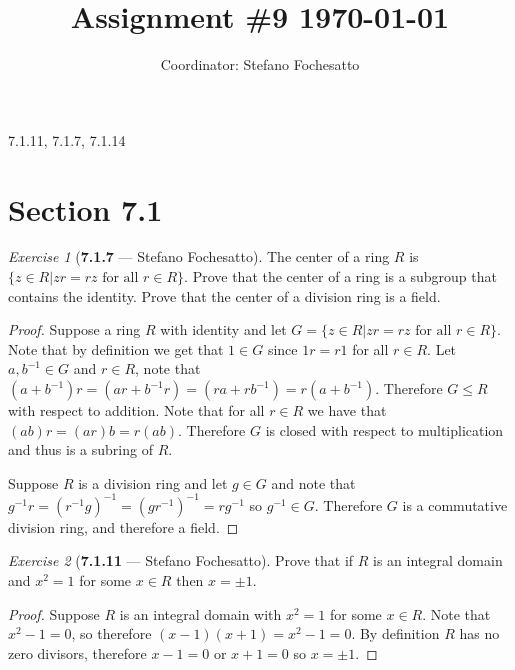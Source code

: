 \documentclass[12pt]{amsart}
\title{Assignment \#9 \today}
\author{Coordinator: Stefano Fochesatto}
\theoremstyle{remark}
\newtheorem*{exercise}{Exercise}%
\theoremstyle{mycomment}
\begin{document}
\maketitle
\doublespacing %

7.1.11, 7.1.7, 7.1.14

\section*{Section 7.1}


\begin{exercise}[\textbf{7.1.7} --- Stefano Fochesatto] The center of a ring $R$ is $\{z \in R| zr = rz \text{ for all } r \in R\}$. Prove that 
  the center of a ring is a subgroup that contains the identity. Prove that the center of a division ring is a field. 
  \begin{proof} Suppose a ring $R$ with identity and let $G = \{z \in R| zr = rz \text{ for all } r \in R\}$. Note that by definition we get that 
    $1 \in G$ since $1r = r1$ for all $r \in R$. Let $a, b^{-1} \in G$ and $r \in R$, note that
    $(a + b^{-1})r = (ar + b^{-1}r) = (ra + rb^{-1}) = r(a + b^{-1})$. Therefore $G \leq R$ with respect to 
    addition. Note that for all $r \in R$ we have that $(ab)r = (ar)b = r(ab)$. Therefore $G$ is closed with respect to multiplication 
    and thus is a subring of $R$. 

    Suppose $R$ is a division ring and let $g \in G$ and note that $g^{-1}r = (r^{-1}g)^{-1} = (gr^{-1})^{-1} = rg^{-1}$
    so $g^{-1} \in G$. Therefore $G$ is a commutative division ring, and therefore a field. 
  \end{proof}
\end{exercise}
\vspace{.15in}



\begin{exercise}[\textbf{7.1.11} --- Stefano Fochesatto] Prove that if $R$ is an integral domain and $x^2 = 1$ for some $x \in R$ then $x = \pm 1$. 
  \begin{proof} Suppose $R$ is an integral domain with $x^2 = 1$ for some $x \in R$. Note that $x^2 - 1 = 0$, so therefore 
    $(x - 1)(x + 1) = x^2 - 1 = 0$. By definition $R$ has no zero divisors, therefore $x - 1 = 0$ or $x + 1 = 0$ so $x = \pm 1$.
    \end{proof}
\end{exercise}
\vspace{.15in}
\end{document}
